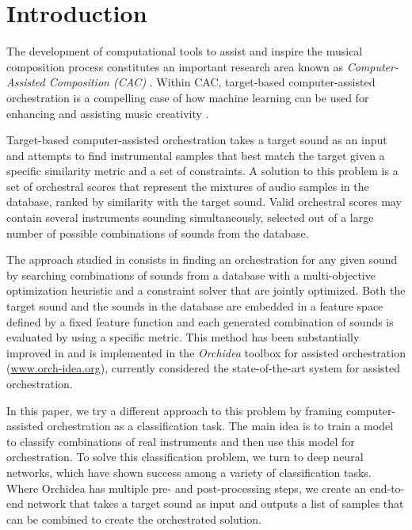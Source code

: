 \documentclass[runningheads,a4paper]{llncs}
\begin{document}
%
\section{Introduction}\label{sec:introduction}

The development of computational tools to assist and inspire the musical composition process constitutes an important research area known as \emph{Computer-Assisted Composition (CAC)} \cite{FerVic2013, Ari2005}. Within CAC, target-based computer-assisted orchestration is a compelling case of how machine learning can be used for {enhancing} and {assisting} music creativity \cite{Maresz2003}. 

Target-based computer-assisted orchestration takes a target sound as an input and attempts to find instrumental samples that best match the target given a specific similarity metric and a set of constraints. A solution to this problem is a set of orchestral scores that represent the mixtures of audio samples in the database, ranked by similarity with the target sound. Valid orchestral scores may contain several instruments sounding simultaneously, selected out of a large number of possible combinations of sounds from the database.

The approach studied in \cite{Carpentier2010} consists in finding an orchestration for any given sound by searching combinations of sounds from a database with a multi-objective optimization heuristic and a constraint solver that are jointly optimized. Both the target sound and the sounds in the database are embedded in a feature space defined by a fixed feature function and each generated combination of sounds is evaluated by using a specific metric. This method has been substantially improved in \cite{Cella18, Cella2020} and is implemented in the \emph{Orchidea} toolbox for assisted orchestration (\url{www.orch-idea.org}), currently considered the state-of-the-art system for assisted orchestration.

In this paper, we try a different approach to this problem by framing computer-assisted orchestration as a classification task. The main idea is to train a model to classify combinations of real instruments and then use this model for orchestration. To solve this classification problem, we turn to deep neural networks, which have shown success among a variety of classification tasks. Where Orchidea has multiple pre- and post-processing steps, we create an end-to-end network that takes a target sound as input and outputs a list of samples that can be combined to create the orchestrated solution. 
\end{document}
